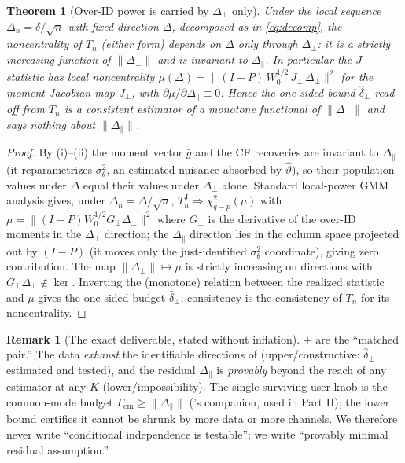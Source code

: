 \documentclass[11pt]{article}
\newtheorem{theorem}{Theorem}
\theoremstyle{definition}
\newtheorem{remark}{Remark}
\newcommand{\wto}{\Rightarrow}
\newcommand{\Th}{\theta}
\newcommand{\lat}{\Th}
\newcommand{\Gcm}{\Gamma_{\mathrm{cm}}}
\newcommand{\Dperp}{\Delta_{\perp}}
\newcommand{\Dpar}{\Delta_{\parallel}}
\begin{document}
\begin{theorem}[Over-ID power is carried by $\Dperp$ only]
\label{thm:power}
Under the local sequence $\Delta_n=\delta/\sqrt n$ with fixed direction
$\Delta$, decomposed as in \eqref{eq:decomp}, the noncentrality of $T_n$
(either form) depends on $\Delta$ \emph{only through $\Dperp$}: it is a strictly
increasing function of $\|\Dperp\|$ and is invariant to $\Dpar$. In particular
the $J$-statistic has local noncentrality
$\mu(\Delta)=\|(I-P)\,W_0^{1/2}\,J_\perp\,\Dperp\|^2$ for the moment Jacobian
map $J_\perp$, with $\partial\mu/\partial\Dpar\equiv0$. Hence the one-sided
bound $\widehat\delta_\perp$ read off from $T_n$ is a consistent estimator of a
monotone functional of $\|\Dperp\|$ and says \emph{nothing} about $\|\Dpar\|$.
\end{theorem}

\begin{proof}
By (i)--(ii) the moment vector $\bar g$ and the CF
recoveries are invariant to $\Dpar$ (it reparametrizes $\sigma_\lat^2$, an
estimated nuisance absorbed by $\widehat\vartheta$), so their population values
under $\Delta$ equal their values under $\Dperp$ alone. Standard local-power
GMM analysis gives, under $\Delta_n=\Delta/\sqrt n$,
$T_n^{\mathrm J}\wto\chi^2_{q-p}(\mu)$ with
$\mu=\|(I-P)W_0^{1/2}G_\perp\Dperp\|^2$ where $G_\perp$ is the derivative of the
over-ID moments in the $\Dperp$ direction; the $\Dpar$ direction lies in the
column space projected out by $(I-P)$ (it moves only the just-identified
$\sigma_\lat^2$ coordinate), giving zero contribution. The map
$\|\Dperp\|\mapsto\mu$ is strictly increasing on directions with $G_\perp\Dperp
\notin\ker$. Inverting the (monotone) relation between the realized statistic
and $\mu$ gives the one-sided budget $\widehat\delta_\perp$; consistency is the
consistency of $T_n$ for its noncentrality.
\end{proof}

\begin{remark}[The exact deliverable, stated without inflation]
 +  are the ``matched pair.'' The data
\emph{exhaust} the identifiable directions of  (upper/constructive:
$\widehat\delta_\perp$ estimated and tested), and the residual $\Dpar$ is
\emph{provably} beyond the reach of any estimator at any $K$ (lower/impossibility).
The single surviving user knob is the common-mode budget
$\Gcm\ge\|\Dpar\|$ ('s companion, used in Part II); the lower
bound certifies it cannot be shrunk by more data or more channels. We therefore
never write ``conditional independence is testable''; we write ``provably
minimal residual assumption.''
\end{remark}
\end{document}
